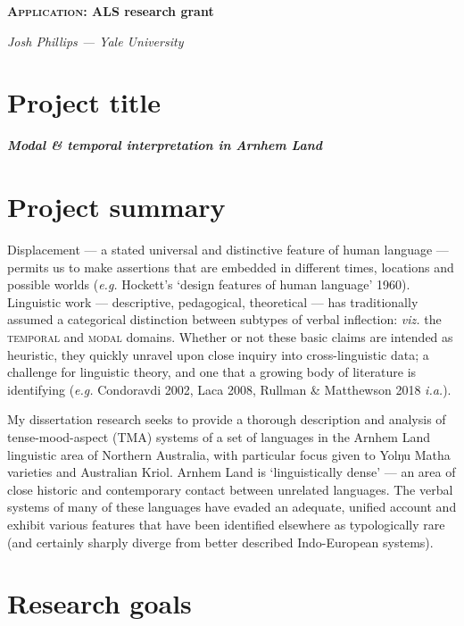 \documentclass[12pt]{article}
\author{Josh}
\date{\today}
\begin{document}
\noindent	\large \textbf{\textsc{Application: }ALS research grant}
	
\noindent	\normalsize \textit{Josh Phillips --- Yale University}
	
\section{Project title}
\textbf{\textit{Modal \& temporal interpretation in Arnhem Land}}

\section{Project summary}

Displacement --- a stated universal and distinctive feature of human language ---  permits us to make assertions that are embedded in different times, locations and possible worlds (\textit{e.g.} Hockett's `design features of human language' 1960). Linguistic work --- descriptive, pedagogical, theoretical --- has traditionally assumed a categorical distinction between subtypes of verbal inflection: \textit{viz.} the \textsc{temporal} and \textsc{modal} domains. Whether or not these basic claims are intended as heuristic, they quickly unravel upon close inquiry into cross-linguistic data; a challenge for linguistic theory, and one that a growing body of literature is identifying (\textit{e.g. }Condoravdi 2002, Laca 2008, Rullman \& Matthewson 2018 \textit{i.a.}).%
	
My dissertation research seeks to provide a thorough description and analysis of tense-mood-aspect (TMA) systems of a set of languages in the Arnhem Land linguistic area of Northern Australia, with particular focus given to Yolŋu Matha varieties and Australian Kriol. Arnhem Land is `linguistically dense' --- an area of close historic and contemporary contact between unrelated languages. The verbal systems of many of these languages have evaded an adequate, unified account and exhibit various features that have been identified elsewhere as typologically rare (and certainly sharply diverge from better described Indo-European systems).


\section{Research goals}
\end{document}
